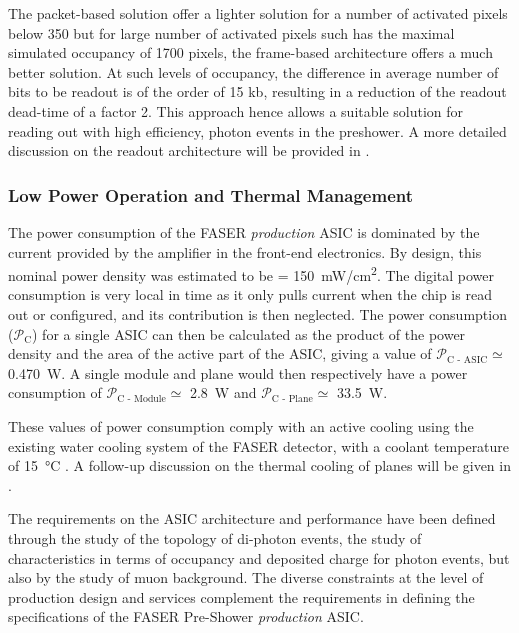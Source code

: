 		The packet-based solution offer a lighter solution for a number of activated pixels below 350 but for large number of activated pixels such has the maximal simulated occupancy of 1700 pixels, the frame-based architecture offers a much better solution. At such levels of occupancy, the difference in average number of bits to be readout is of the order of 15 kb, resulting in a reduction of the readout dead-time of a factor 2. This approach hence allows a suitable solution for reading out with high efficiency, photon events in the preshower. A more detailed discussion on the readout architecture will be provided in .
		
		\subsubsection{Low Power Operation and Thermal Management}
		The power consumption of the FASER \textit{production} ASIC is dominated by the current provided by the amplifier in the front-end electronics. By design, this nominal power density was estimated to be \power = \SI{150}{\milli\watt/\centi\meter\squared}. The digital power consumption is very local in time as it only pulls current when the chip is read out or configured, and its contribution is then neglected. The power consumption ($\mathcal{P}_{\text{C}}$) for a single ASIC can then be calculated as the product of the power density and the area of the active part of the ASIC, giving a value of $\mathcal{P}_{\text{C - ASIC}} \simeq $ \SI{0.470}{\watt}. A single module and plane would then respectively have a power consumption of $\mathcal{P}_{\text{C - Module}} \simeq $ \SI{2.8}{\watt} and $\mathcal{P}_{\text{C - Plane}} \simeq $ \SI{33.5}{\watt}.
		
		These values of power consumption comply with an active cooling using the existing water cooling system of the FASER detector, with a coolant temperature of \SI{15}{\celsius} \cite{PreShower_TP}. A follow-up discussion on the thermal cooling of planes will be given in .
		
		
		The requirements on the ASIC architecture and performance have been defined through the study of the topology of di-photon events, the study of characteristics in terms of occupancy and deposited charge for photon events, but also by the study of muon background. The diverse constraints at the level of production design and services complement the requirements in defining the specifications of the FASER Pre-Shower \textit{production} ASIC.   
		
